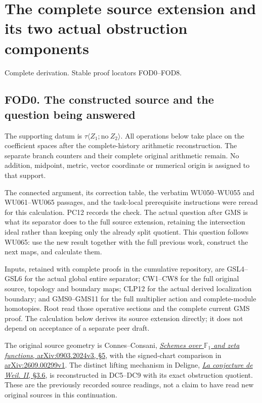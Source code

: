 \section{The complete source extension and its two actual obstruction
components}\label{the-complete-source-extension-and-its-two-actual-obstruction-components}

Complete derivation. Stable proof locators FOD0--FOD8.

\subsection{FOD0. The constructed source and the question being
answered}\label{fod0.-the-constructed-source-and-the-question-being-answered}

The supporting datum is \(\tau\langle Z_1;\mathrm{no}\ Z_2\rangle\). All
operations below take place on the coefficient spaces after the
complete-history arithmetic reconstruction. The separate branch counters
and their complete original arithmetic remain. No addition, midpoint,
metric, vector coordinate or numerical origin is assigned to that
support.

The connected argument, its correction table, the verbatim WU050--WU055
and WU061--WU065 passages, and the task-local prerequisite instructions
were reread for this calculation. PC12 records the check. The actual
question after GMS is what its separator does to the full source
extension, retaining the intersection ideal rather than keeping only the
already split quotient. This question follows WU065: use the new result
together with the full previous work, construct the next maps, and
calculate them.

Inputs, retained with complete proofs in the cumulative repository, are
GSL4--GSL6 for the actual global entire separator; CW1--CW8 for the full
original source, topology and boundary maps; CLP12 for the actual
derived localization boundary; and GMS0--GMS11 for the full multiplier
action and complete-module homotopies. Root read those operative
sections and the complete current GMS proof. The calculation below
derives its source extension directly; it does not depend on acceptance
of a separate peer draft.

The original source geometry is Connes--Consani,
\href{https://arxiv.org/abs/0903.2024v3}{\emph{Schemes over
\(\mathbb F_1\) and zeta functions}, arXiv:0903.2024v3, §5}, with the
signed-chart comparison in
\href{https://arxiv.org/abs/2609.00299v1}{arXiv:2609.00299v1}. The
distinct lifting mechanism in Deligne,
\href{https://www.numdam.org/item/PMIHES_1980__52__137_0/}{\emph{La
conjecture de Weil. II}, §3.6}, is reconstructed in DC5--DC9 with its
exact obstruction quotient. These are the previously recorded source
readings, not a claim to have read new original sources in this
continuation.

